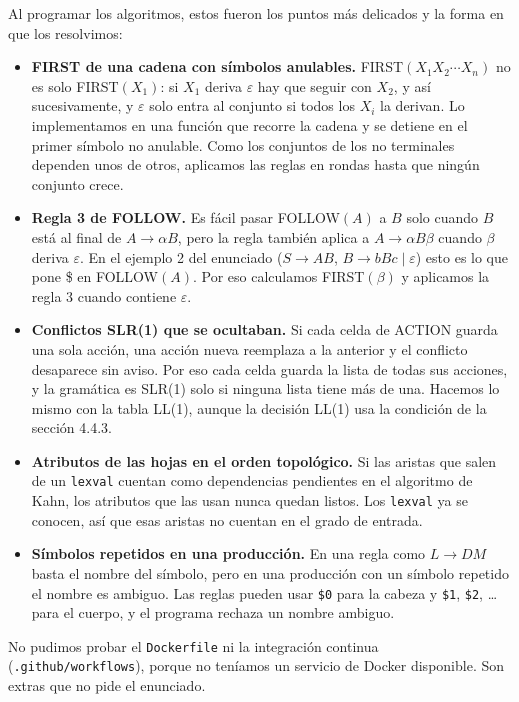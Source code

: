 \documentclass[11pt,a4paper]{article}
\begin{document}
Al programar los algoritmos, estos fueron los puntos más delicados y la forma en que los resolvimos:
\begin{itemize}
\item \textbf{FIRST de una cadena con símbolos anulables.} FIRST$(X_1X_2\cdots X_n)$ no es solo FIRST$(X_1)$: si $X_1$ deriva $\varepsilon$ hay que seguir con $X_2$, y así sucesivamente, y $\varepsilon$ solo entra al conjunto si todos los $X_i$ la derivan. Lo implementamos en una función que recorre la cadena y se detiene en el primer símbolo no anulable. Como los conjuntos de los no terminales dependen unos de otros, aplicamos las reglas en rondas hasta que ningún conjunto crece.
\item \textbf{Regla 3 de FOLLOW.} Es fácil pasar FOLLOW$(A)$ a $B$ solo cuando $B$ está al final de $A\to\alpha B$, pero la regla también aplica a $A\to\alpha B\beta$ cuando $\beta$ deriva $\varepsilon$. En el ejemplo 2 del enunciado ($S\to AB$, $B\to bBc \mid \varepsilon$) esto es lo que pone \$ en FOLLOW$(A)$. Por eso calculamos FIRST$(\beta)$ y aplicamos la regla 3 cuando contiene $\varepsilon$.
\item \textbf{Conflictos SLR(1) que se ocultaban.} Si cada celda de ACTION guarda una sola acción, una acción nueva reemplaza a la anterior y el conflicto desaparece sin aviso. Por eso cada celda guarda la lista de todas sus acciones, y la gramática es SLR(1) solo si ninguna lista tiene más de una. Hacemos lo mismo con la tabla LL(1), aunque la decisión LL(1) usa la condición de la sección 4.4.3.
\item \textbf{Atributos de las hojas en el orden topológico.} Si las aristas que salen de un \texttt{lexval} cuentan como dependencias pendientes en el algoritmo de Kahn, los atributos que las usan nunca quedan listos. Los \texttt{lexval} ya se conocen, así que esas aristas no cuentan en el grado de entrada.
\item \textbf{Símbolos repetidos en una producción.} En una regla como $L\to DM$ basta el nombre del símbolo, pero en una producción con un símbolo repetido el nombre es ambiguo. Las reglas pueden usar \texttt{\$0} para la cabeza y \texttt{\$1}, \texttt{\$2}, \dots{} para el cuerpo, y el programa rechaza un nombre ambiguo.
\end{itemize}

No pudimos probar el \texttt{Dockerfile} ni la integración continua (\texttt{.github/workflows}), porque no teníamos un servicio de Docker disponible. Son extras que no pide el enunciado.
\end{document}
